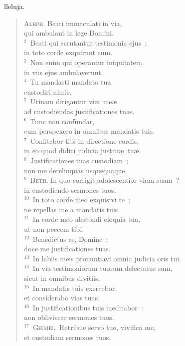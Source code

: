 \bchapter[Psalm]
lleluja. \begin{verse}\textsc{Aleph.} Beati immaculati in via,\\ qui ambulant in lege Domini.\\
${}^{2}$~Beati qui scrutantur testimonia ejus~;\\ in toto corde exquirunt eum.\\
${}^{3}$~Non enim qui operantur iniquitatem\\ in viis ejus ambulaverunt.\\
${}^{4}$~Tu mandasti mandata tua\\ custodiri nimis.\\
${}^{5}$~Utinam dirigantur vi\ae\ me\ae \\ ad custodiendas justificationes tuas.\\
${}^{6}$~Tunc non confundar,\\ cum perspexero in omnibus mandatis tuis.\\
${}^{7}$~Confitebor tibi in directione cordis,\\ in eo quod didici judicia justiti\ae\ tu\ae .\\
${}^{8}$~Justificationes tuas custodiam~;\\ non me derelinquas usquequaque.\\
${}^{9}$~\textsc{Beth.} In quo corrigit adolescentior viam suam~?\\ in custodiendo sermones tuos.\\
${}^{10}$~In toto corde meo exquisivi te~;\\ ne repellas me a mandatis tuis.\\
${}^{11}$~In corde meo abscondi eloquia tua,\\ ut non peccem tibi.\\
${}^{12}$~Benedictus es, Domine~;\\ doce me justificationes tuas.\\
${}^{13}$~In labiis meis pronuntiavi omnia judicia oris tui.\\
${}^{14}$~In via testimoniorum tuorum delectatus sum,\\ sicut in omnibus divitiis.\\
${}^{15}$~In mandatis tuis exercebor,\\ et considerabo vias tuas.\\
${}^{16}$~In justificationibus tuis meditabor~:\\ non obliviscar sermones tuos.\\
${}^{17}$~\textsc{Ghimel.} Retribue servo tuo, vivifica me,\\ et custodiam sermones tuos.\\

\end{verse}
